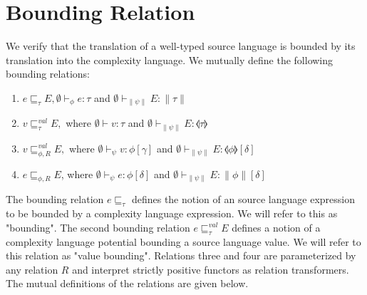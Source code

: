 \section{Bounding Relation}
%
We verify that the translation of a well-typed source language is bounded
by its translation into the complexity language. We mutually define the
following bounding relations:
%
\begin{enumerate}
  \item $e \sqsubseteq_\tau E, \emptyset \vdash_\phi e : \tau$ and $\emptyset \vdash_{\|\psi\|} E : \|\tau\|$
  \item $v \sqsubseteq_\tau^{val} E, $ where $\emptyset \vdash v : \tau$ and $\emptyset \vdash_{\|\psi\|} E : \llangle \tau \rrangle$
  \item $v \sqsubseteq_{\phi,R}^{val} E, $ where $ \emptyset \vdash_\psi v : \phi[\gamma]$ and $\emptyset \vdash_{\|\psi\|} E : \llangle \phi \rrangle[\delta]$
  \item $e \sqsubseteq_{\phi,R} E$, where $\emptyset \vdash_\psi e : \phi[\delta]$ and $\emptyset \vdash_{\|\psi\|} E : \|\phi\|[\delta]$
\end{enumerate}
%
The bounding relation $e \sqsubseteq_\tau$ defines the notion of an source
language expression to be bounded by a complexity language expression. We will
refer to this as "bounding". The second bounding relation $e
\sqsubseteq_\tau^{val} E$ defines a notion of a complexity language potential
bounding a source language value. We will refer to this relation as "value
bounding". Relations three and four are parameterized by any relation $R$ and
interpret strictly positive functors as relation transformers. The mutual
definitions of the relations are given below.
%
